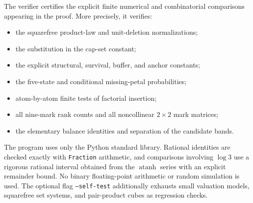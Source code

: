 \documentclass[11pt]{article}
\numberwithin{equation}{section}
\theoremstyle{plain}
\newcommand{\1}{\mathbf 1}
\begin{document}
The verifier certifies the explicit finite numerical and combinatorial
comparisons appearing in the proof.  More precisely, it verifies:
\begin{itemize}
 \item the squarefree product-law and unit-deletion normalizations;
 \item the substitution in the cap-set constant;
 \item the explicit structural, survival, buffer, and anchor constants;
 \item the five-state and conditional missing-petal probabilities;
 \item atom-by-atom finite tests of factorial insertion;
 \item all nine-mark rank counts and all noncollinear $2\times2$ mark
       matrices;
 \item the elementary balance identities and separation of the candidate
       bands.
\end{itemize}

The program uses only the Python standard library.  Rational identities are
checked exactly with \texttt{Fraction} arithmetic, and comparisons involving
$\log 3$ use a rigorous rational interval obtained from the
$\operatorname{atanh}$ series with an explicit remainder bound.  No binary
floating-point arithmetic or random simulation is used.  The optional flag
\texttt{--self-test} additionally exhausts small valuation models,
squarefree set systems, and pair-product cubes as regression checks.
\end{document}
